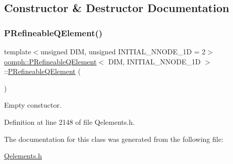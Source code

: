 \subsection{Constructor \& Destructor Documentation}
\mbox{\label{classoomph_1_1PRefineableQElement_a795206217640d5e909b5162c13f94af9}} 
\subsubsection{\texorpdfstring{P\+Refineable\+Q\+Element()}{PRefineableQElement()}}
{\footnotesize\ttfamily template$<$unsigned D\+IM, unsigned I\+N\+I\+T\+I\+A\+L\+\_\+\+N\+N\+O\+D\+E\+\_\+1D = 2$>$ \\
\hyperlink{classoomph_1_1PRefineableQElement}{oomph\+::\+P\+Refineable\+Q\+Element}$<$ D\+IM, I\+N\+I\+T\+I\+A\+L\+\_\+\+N\+N\+O\+D\+E\+\_\+1D $>$\+::\hyperlink{classoomph_1_1PRefineableQElement}{P\+Refineable\+Q\+Element} (\begin{DoxyParamCaption}{ }\end{DoxyParamCaption})\hspace{0.3cm}{\ttfamily [inline]}}



Empty constuctor. 



Definition at line 2148 of file Qelements.\+h.



The documentation for this class was generated from the following file\+:\begin{DoxyCompactItemize}
\item 
\hyperlink{Qelements_8h}{Qelements.\+h}\end{DoxyCompactItemize}
